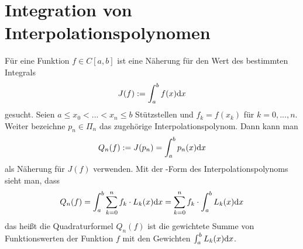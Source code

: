 \section{Integration von Interpolationspolynomen}

Für eine Funktion $f\in C[a,b]$ ist eine Näherung für den Wert des bestimmten Integrals
\begin{align}
	J(f) := \int_a^b f(x)\mathrm{d} x\notag
\end{align}
gesucht. Seien $a\le x_0<...<x_n\le b$ Stützstellen und $f_k=f(x_k)$ für $k=0,...,n$. Weiter bezeichne $p_n\in\Pi_n$ das zugehörige Interpolationspolynom. Dann kann man
\begin{align}
	Q_n(f) := J(p_n) = \int_a^b p_n(x)\mathrm{d} x\notag
\end{align}
als Näherung für $J(f)$ verwenden. Mit der -Form des Interpolationspolynoms sieht man, dass
\begin{align}
	Q_n(f)=\int_a^b \sum_{k=0}^n f_k\cdot L_k(x)\mathrm{d} x=\sum_{k=0}^n f_k\cdot\int_a^b L_k(x)\mathrm{d} x\notag
\end{align}
das heißt die Quadraturformel $Q_n(f)$ ist die gewichtete Summe von Funktionswerten der Funktion $f$ mit den Gewichten $\int_a^b L_k(x)\mathrm{d} x$.